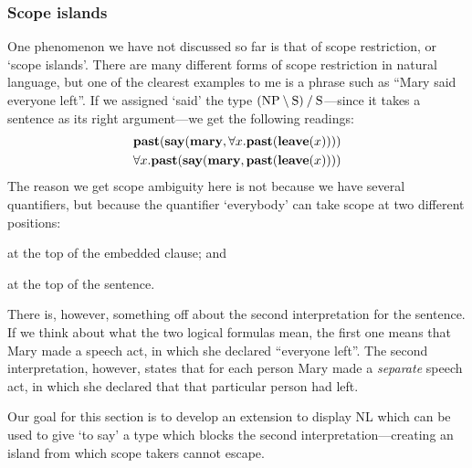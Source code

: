 \subsubsection{Scope islands}
\label{sec:scope-islands}

One phenomenon we have not discussed so far is that of scope
restriction, or `scope islands'. There are many different forms of
scope restriction in natural language, but one of the clearest
examples to me is a phrase such as ``Mary said everyone left''. If we
assigned `said' the type $(\text{NP}\mathbin{\backslash}\text{S})\mathbin{\slash}\text{S}$---since it takes a
sentence as its right argument---we get the following readings:
\begin{gather*}
  \mathbf{past}(\mathbf{say}(\mathbf{mary},\forall{x}.\mathbf{past}(\mathbf{leave}(x))))\\
  \forall{x}.\mathbf{past}(\mathbf{say}(\mathbf{mary},\mathbf{past}(\mathbf{leave}(x))))
\end{gather*}
The reason we get scope ambiguity here is not because we have several
quantifiers, but because the quantifier `everybody' can take scope at
two different positions:
\begin{enumerate*}[label=(\arabic*)]
\item at the top of the embedded clause; and
\item at the top of the sentence.
\end{enumerate*}

There is, however, something off about the second interpretation for
the sentence. If we think about what the two logical formulas mean,
the first one means that Mary made a speech act, in which she declared
``everyone left''. The second interpretation, however, states that for
each person Mary made a \emph{separate} speech act, in which she
declared that that particular person had left.

Our goal for this section is to develop an extension to display NL
which can be used to give `to say' a type which blocks the second
interpretation---creating an island from which scope takers cannot
escape.


